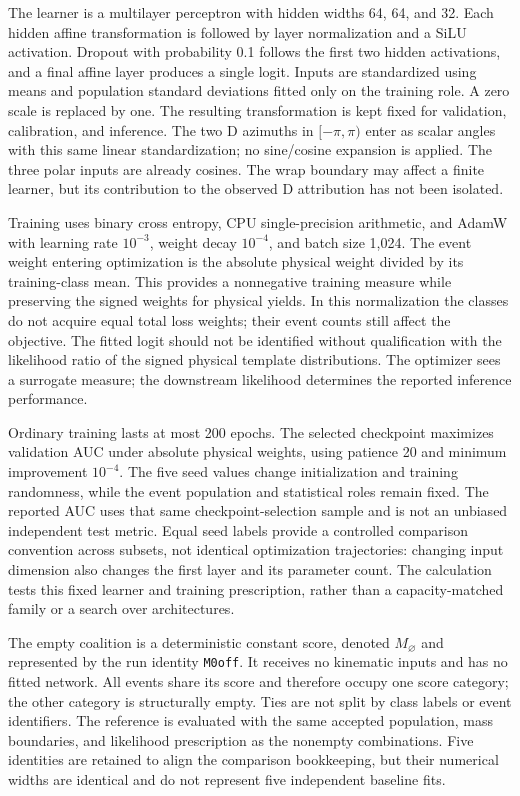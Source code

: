 \documentclass[aps,prd,reprint,superscriptaddress,nofootinbib,longbibliography,floatfix]{revtex4-2}
\newcommand{\Mempty}{M_{\varnothing}}
\begin{document}
The learner is a multilayer perceptron with hidden widths 64, 64, and 32.
Each hidden affine transformation is followed by layer normalization and a
SiLU activation. Dropout with probability 0.1 follows the first two hidden
activations, and a final affine layer produces a single logit. Inputs are
standardized using means and population standard deviations fitted only on
the training role. A zero scale is replaced by one. The resulting
transformation is kept fixed for validation, calibration, and inference.
The two D azimuths in $[-\pi,\pi)$ enter as scalar angles with this same
linear standardization; no sine/cosine expansion is applied. The three polar
inputs are already cosines. The wrap boundary may affect a finite learner,
but its contribution to the observed D attribution has not been isolated.

Training uses binary cross entropy, CPU single-precision arithmetic, and
AdamW with learning rate $10^{-3}$, weight decay $10^{-4}$, and batch size
1,024. The event weight entering optimization is the absolute physical weight
divided by its training-class mean. This provides a nonnegative training
measure while preserving the signed weights for physical yields. In
this normalization the classes do not acquire equal total loss weights;
their event counts still affect the objective. The fitted logit should
not be identified without qualification
with the likelihood ratio of the signed physical template distributions.
The optimizer sees a surrogate measure; the downstream likelihood determines
the reported inference performance.

Ordinary training lasts at most 200 epochs. The selected checkpoint maximizes
validation AUC under absolute physical weights, using patience 20 and minimum
improvement $10^{-4}$. The five seed values change initialization and
training randomness, while the event population and statistical roles remain
fixed. The reported AUC uses that same checkpoint-selection sample and is
not an unbiased independent test metric. Equal seed labels provide a controlled comparison convention across
subsets, not identical optimization trajectories: changing input dimension
also changes the first layer and its parameter count. The calculation tests
this fixed learner and training prescription, rather than a capacity-matched
family or a search over architectures.

The empty coalition is a deterministic constant score, denoted
$\Mempty$ and represented by the run identity \texttt{M0off}. It receives no
kinematic inputs and has no fitted network. All events share its score and
therefore occupy one score category; the other category is structurally
empty. Ties are not split by class labels or event identifiers. The reference
is evaluated with the same accepted population, mass boundaries, and
likelihood prescription as the nonempty combinations. Five identities are
retained to align the comparison bookkeeping, but their numerical widths
are identical and do not represent five independent baseline fits.
\end{document}
